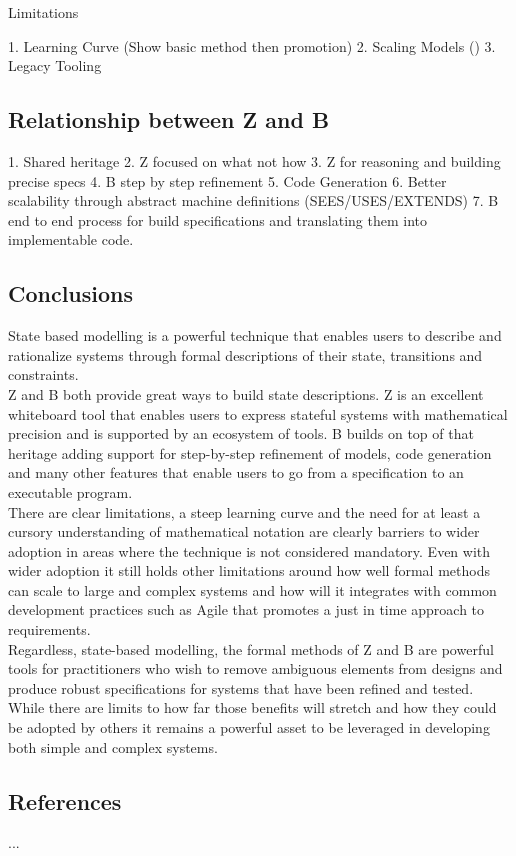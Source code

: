 \documentclass{article}
\begin{document}
Limitations

1. Learning Curve (Show basic method then promotion)
2. Scaling Models ()
3. Legacy Tooling

\pagebreak
\pagebreak
\subsection*{Relationship between Z and B}

1. Shared heritage
2. Z focused on what not how
3. Z for reasoning and building precise specs 
4. B step by step refinement 
5. Code Generation
6. Better scalability through abstract machine definitions (SEES/USES/EXTENDS)
7. B end to end process for build specifications and translating them into implementable code.

\pagebreak
\subsection*{Conclusions}

State based modelling is a powerful technique that enables users to describe and rationalize systems through formal descriptions of their state, transitions and constraints. \\
\newline
Z and B both provide great ways to build state descriptions. Z is an excellent whiteboard tool that enables users to express stateful systems with mathematical precision and is supported by an ecosystem of tools. B builds on top of that heritage adding support for step-by-step refinement of models, code generation and many other features that enable users to go from a specification to an executable program. \\
\newline
There are clear limitations, a steep learning curve and the need for at least a cursory understanding of mathematical notation are clearly barriers to wider adoption in areas where the technique is not considered mandatory. Even with wider adoption it still holds other limitations around how well formal methods can scale to large and complex systems and how will it integrates with common development practices such as Agile that promotes a just in time approach to requirements.  \\
\newline
Regardless, state-based modelling, the formal methods of Z and B are powerful tools for practitioners who wish to remove ambiguous elements from designs and produce robust specifications for systems that have been refined and tested. While there are limits to how far those benefits will stretch and how they could be adopted by others it remains a powerful asset to be leveraged in developing both simple and complex systems. \\
\pagebreak

\subsection*{References}

...
\end{document}

